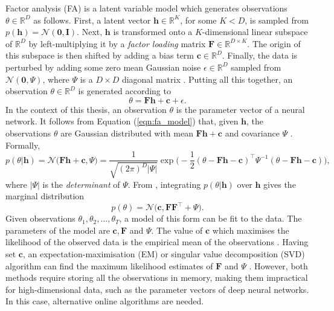 \documentclass[msc,deptreport.inf]{infthesis} %
\newcommand{\matr}[1]{\mathbf{#1}}
\newcommand{\R}{\mathbb R}
\begin{document}
Factor analysis (FA) is a latent variable model which generates observations $\theta \in \R^D$ as follows. First, a latent vector $\matr{h} \in \R^K$, for some $K < D$, is sampled from $p(\matr{h}) = \mathcal{N}(\matr{0}, \matr{I})$. Next, $\matr{h}$ is transformed onto a $K$-dimensional linear subspace of $\R^D$ by left-multiplying it by a \emph{factor loading} matrix $\matr{F} \in \R^{D \times K}$. The origin of this subspace is then shifted by adding a bias term $\matr{c} \in \R^D$. Finally, the data is perturbed by adding some zero mean Gaussian noise $\epsilon \in \R^D$ sampled from $\mathcal{N}(\matr{0}, \Psi)$, where $\Psi$ is a $D\times D$ diagonal matrix \cite{barber2007}. Putting all this together, an observation $\theta \in \R^D$ is generated according to 
\begin{equation}\label{eqn:fa_model}
	\theta = \matr{Fh} + \matr{c} + \epsilon.
\end{equation}
In the context of this thesis, an observation $\theta$ is the parameter vector of a neural network. It follows from Equation (\ref{eqn:fa_model}) that, given $\matr{h}$, the observations $\theta$ are Gaussian distributed with mean $\matr{Fh} + \matr{c}$ and covariance $\Psi$ \cite{barber2007}. Formally,
\begin{equation}\label{eqn:fa_cond_dist}
	p(\theta | \matr{h}) 
	= \mathcal{N}\big( \matr{Fh} + \matr{c}, \Psi \big)
	= \frac{1}{\sqrt{(2\pi)^D |\Psi|}} 
	\exp \Big(-\frac{1}{2} (\theta - \matr{Fh} - \matr{c})^\intercal \Psi^{-1} (\theta - \matr{Fh} - \matr{c})\Big),
\end{equation}
where $|\Psi|$ is the \emph{determinant} of $\Psi$. From \cite{barber2007}, integrating $p(\theta | \matr{h})$ over $\matr{h}$ gives the marginal distribution
\begin{equation}\label{eqn:fa_marginal_dist}
	p(\theta) = \mathcal{N}\big(\matr{c}, \matr{FF}^{\intercal} + \Psi\big).
\end{equation}
Given observations $\theta_1, \theta_2, \dots, \theta_T$, a model of this form can be fit to the data. The parameters of the model are $\matr{c}, \matr{F}$ and $\Psi$. The value of $\matr{c}$ which maximises the likelihood of the observed data is the empirical mean of the observations \cite{barber2007}. Having set $\matr{c}$, an expectation-maximisation (EM) or singular value decomposition (SVD) algorithm can find the maximum likelihood estimates of $\matr{F}$ and $\Psi$ \cite{barber2007}. However, both methods require storing all the observations in memory, making them impractical for high-dimensional data, such as the parameter vectors of deep neural networks. In this case, alternative online algorithms are needed.  
\end{document}
